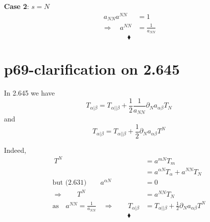 \textbf{Case 2}: $s= N$
\begin{align*}
\  a_{NN}a^{N N} &=1 \\
\Rightarrow \quad a^{N N} &=\frac{1}{a_{NN}}
\end{align*}
$$\blacklozenge$$
\newpage


\section{p69-clarification on 2.645}
\begin{tcolorbox}
In 2.645 we have $$T_{\alpha | \beta} =T_{\alpha || \beta}  +\frac{1}{2}\frac{1}{a_{NN}}\partial_N  a_{\alpha\beta}T_{N}$$ and $$T_{\alpha | \beta} =T_{\alpha || \beta}  +\frac{1}{2}\partial_N  a_{\alpha\beta}T^{N}$$
\end{tcolorbox}
Indeed,
\begin{align*}
\ T^N &= a^{mN}T_m\\
\ & = a^{\alpha N}T_{\alpha}+a^{N N}T_{N}\\
\text{but (2.631)}\quad\quad a^{\alpha N} &= 0\\
\Rightarrow \quad\quad T^N &= a^{NN} T_N\\
\text{as}\quad a^{NN}= \frac{1}{a_{NN}} \quad \Rightarrow \quad\quad  T_{\alpha | \beta} &= T_{\alpha || \beta}  + \frac{1}{2}\partial_N  a_{\alpha\beta}T^{N}
\end{align*}
$$\blacklozenge$$
\newpage

